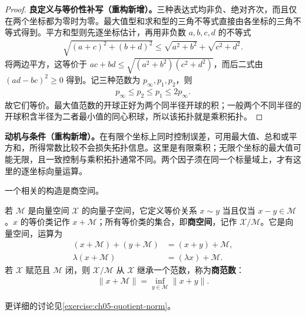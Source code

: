 \documentclass[../../main.tex]{subfiles}
\begin{document}
\begin{proof}
\textbf{良定义与等价性补写（重构新增）。}三种表达式均非负、绝对齐次，而且仅在两个坐标都为零时为零。最大值型和求和型的三角不等式直接由各坐标的三角不等式得到。平方和型则先逐坐标估计，再用非负数 $a,b,c,d$ 的不等式
\begin{align*}
\sqrt{(a+c)^2+(b+d)^2}\le\sqrt{a^2+b^2}+\sqrt{c^2+d^2}.
\end{align*}
将两边平方，这等价于 $ac+bd\le\sqrt{(a^2+b^2)(c^2+d^2)}$，而后二式由 $(ad-bc)^2\ge0$ 得到。记三种范数为 $p_\infty,p_1,p_2$，则
\begin{align*}
p_\infty\le p_2\le p_1\le2p_\infty.
\end{align*}
故它们等价。最大值范数的开球正好为两个同半径开球的积；一般两个不同半径的开球积含半径为二者最小值的同心积球，所以该拓扑就是乘积拓扑。
\end{proof}
\begin{remark}
\textbf{动机与条件（重构新增）。}在有限个坐标上同时控制误差，可用最大值、总和或平方和，所得常数比较不会损失拓扑信息。这里是有限乘积；无限个坐标的最大值可能无限，且一致控制与乘积拓扑通常不同。两个因子须在同一个标量域上，才有这里的逐坐标向量运算。
\end{remark}
一个相关的构造是商空间。
\begin{definition}[商空间与商范数]\label{definition:ch05-quotient-norm}
若 $\mathcal M$ 是向量空间 $\mathcal X$ 的向量子空间，它定义等价关系 $x\sim y$ 当且仅当 $x-y\in\mathcal M$。$x$ 的等价类记作 $x+\mathcal M$；所有等价类的集合，即\textbf{商空间}，记作 $\mathcal X/\mathcal M$。它是向量空间，运算为
\begin{align*}
(x+\mathcal M)+(y+\mathcal M)&=(x+y)+\mathcal M,\\
\lambda(x+\mathcal M)&=(\lambda x)+\mathcal M.
\end{align*}
若 $\mathcal X$ 赋范且 $\mathcal M$ 闭，则 $\mathcal X/\mathcal M$ 从 $\mathcal X$ 继承一个范数，称为\textbf{商范数}：
\begin{align*}
\|x+\mathcal M\|=\inf_{y\in\mathcal M}\|x+y\|.
\end{align*}
\end{definition}
更详细的讨论见\cref{exercise:ch05-quotient-norm}。
\end{document}
